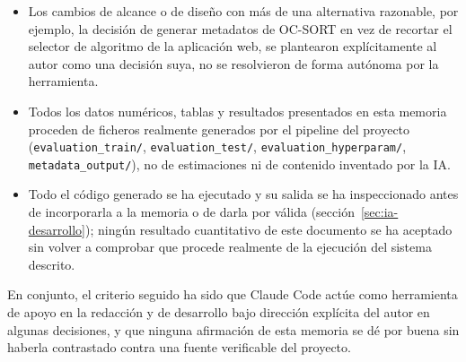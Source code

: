\begin{itemize}
  \item Los cambios de alcance o de diseño con más de una alternativa
        razonable, por ejemplo, la decisión de generar metadatos de
        OC-SORT en vez de recortar el selector de algoritmo de la
        aplicación web, se plantearon
        explícitamente al autor como una decisión suya, no se resolvieron
        de forma autónoma por la herramienta.
  \item Todos los datos numéricos, tablas y resultados presentados en esta
        memoria proceden de ficheros realmente generados por el pipeline
        del proyecto (\texttt{evaluation\_train/}, \texttt{evaluation\_test/},
        \texttt{evaluation\_hyperparam/}, \texttt{metadata\_output/}), no de
        estimaciones ni de contenido inventado por la IA.
  \item Todo el código generado se ha ejecutado y su salida se ha
        inspeccionado antes de incorporarla a la memoria o de darla por
        válida (sección~\ref{sec:ia-desarrollo}); ningún resultado
        cuantitativo de este documento se ha aceptado sin volver a
        comprobar que procede realmente de la ejecución del sistema
        descrito.
\end{itemize}

En conjunto, el criterio seguido ha sido que Claude Code actúe como
herramienta de apoyo en la redacción y de desarrollo bajo dirección explícita del
autor en algunas decisiones, y que ninguna afirmación de esta
memoria se dé por buena sin haberla contrastado contra una
fuente verificable del proyecto.
